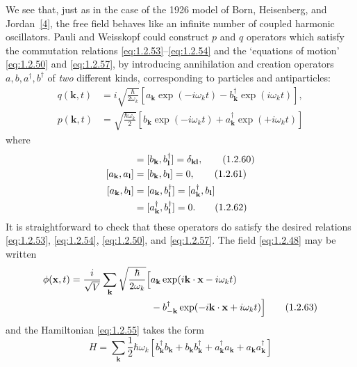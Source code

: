 We see that, just as in the case of the 1926 model of Born, Heisenberg, and
Jordan~\hyperref[ref:1.4]{[4]}, the free field behaves like an infinite number of coupled harmonic
oscillators. Pauli and Weisskopf could construct $p$ and $q$ operators which
satisfy the commutation relations \eqref{eq:1.2.53}--\eqref{eq:1.2.54} and the `equations of
motion' \eqref{eq:1.2.50} and \eqref{eq:1.2.57}, by introducing annihilation and creation
operators $a,b,a^{\dagger},b^{\dagger}$ of \emph{two} different kinds,
corresponding to particles and antiparticles:
\begin{align}
  q(\mathbf k,t)&=i\sqrt{\frac{\hbar}{2\omega_k}}
  \left[a_{\mathbf k}\exp(-i\omega_kt)
       -b^{\dagger}_{\mathbf k}\exp(i\omega_kt)\right],
  \tag{1.2.58}\label{eq:1.2.58}\\
  p(\mathbf k,t)&=\sqrt{\frac{\hbar\omega_k}{2}}
  \left[b_{\mathbf k}\exp(-i\omega_kt)
       +a^{\dagger}_{\mathbf k}\exp(+i\omega_kt)\right]
  \tag{1.2.59}\label{eq:1.2.59}
\end{align}
where
\begin{align}
  [a_{\mathbf k},a^{\dagger}_{\mathbf l}]
    &=[b_{\mathbf k},b^{\dagger}_{\mathbf l}]=\delta_{\mathbf k\mathbf l},
  \tag{1.2.60}\label{eq:1.2.60}\\
  [a_{\mathbf k},a_{\mathbf l}]
    &=[b_{\mathbf k},b_{\mathbf l}]=0,
  \tag{1.2.61}\label{eq:1.2.61}\\
  [a_{\mathbf k},b_{\mathbf l}]
    &=[a_{\mathbf k},b^{\dagger}_{\mathbf l}]
     =[a^{\dagger}_{\mathbf k},b_{\mathbf l}]
  \notag\\
    &=[a^{\dagger}_{\mathbf k},b^{\dagger}_{\mathbf l}]=0.
  \tag{1.2.62}\label{eq:1.2.62}
\end{align}
It is straightforward to check that these operators do satisfy the desired
relations \eqref{eq:1.2.53}, \eqref{eq:1.2.54}, \eqref{eq:1.2.50}, and \eqref{eq:1.2.57}. The field \eqref{eq:1.2.48} may
be written
\begin{align}
  \phi(\mathbf x,t)=\frac{i}{\sqrt V}\sum_{\mathbf k}
  \sqrt{\frac{\hbar}{2\omega_k}}\Bigl[
    &a_{\mathbf k}\exp(i\mathbf k\cdot\mathbf x-i\omega_kt)
  \notag\\
    &-b^{\dagger}_{-\mathbf k}
      \exp(-i\mathbf k\cdot\mathbf x+i\omega_kt)\Bigr]
  \tag{1.2.63}\label{eq:1.2.63}
\end{align}
and the Hamiltonian \eqref{eq:1.2.55} takes the form
\[
  H=\sum_{\mathbf k}\frac12\hbar\omega_k
  \left[b^{\dagger}_{\mathbf k}b_{\mathbf k}
       +b_{\mathbf k}b^{\dagger}_{\mathbf k}
       +a^{\dagger}_{\mathbf k}a_{\mathbf k}
       +a_{\mathbf k}a^{\dagger}_{\mathbf k}\right]
\]
